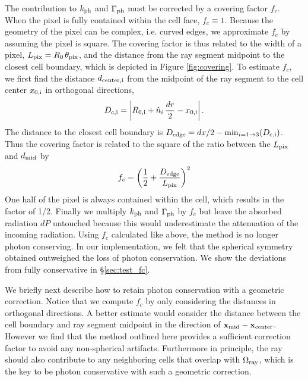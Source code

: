 \documentclass[12pt,preprint]{aastex}
\begin{document}
The contribution to $k_{\rm ph}$ and $\Gamma_{\rm ph}$ must be
corrected by a covering factor $f_c$.  When the pixel is fully
contained within the cell face, $f_c \equiv 1$.  Because the geometry
of the pixel can be complex, i.e. curved edges, we approximate $f_c$
by assuming the pixel is square.  The covering factor is thus related
to the width of a pixel, $L_{\rm pix} = R_0 \, \theta_{\rm pix}$, and
the distance from the ray segment midpoint to the closest cell
boundary, which is depicted in Figure \ref{fig:covering}.  To estimate
$f_c$, we first find the distance $d_{\rm center,i}$ from the midpoint
of the ray segment to the cell center $x_{\rm 0,i}$ in orthogonal
directions,
%
\begin{equation}
  \label{eqn:midpoint}
  D_{\rm c,i} = \left| R_{\rm 0,i} + \hat{n}_i\,\frac{dr}{2} - x_{\rm
      0,i} \right|.
\end{equation}
The distance to the closest cell boundary is $D_{\rm edge} = dx/2 -
\min_{i=1 \rightarrow 3} (D_{\rm c,i})$.  Thus the covering
factor is related to the square of the ratio between the $L_{\rm pix}$
and $d_{\rm mid}$ by
%
\begin{equation}
  \label{eqn:fc}
  f_c = \left( \frac{1}{2} + \frac{D_{\rm edge}}{L_{\rm pix}} \right)^2
\end{equation}
One half of the pixel is always contained within the cell, which
results in the factor of 1/2.  Finally we multiply $k_{\rm ph}$ and
$\Gamma_{\rm ph}$ by $f_c$ but leave the absorbed radiation $dP$
untouched because this would underestimate the attenuation of the
incoming radiation.  Using $f_c$ calculated like above, the method is
no longer photon conserving.  In our implementation, we felt that the
spherical symmetry obtained outweighed the loss of photon
conservation.  We show the deviations from fully conservative in
\S\ref{sec:test_fc}.  

We briefly next describe how to retain photon conservation with a
geometric correction.  Notice that we compute $f_c$ by only
considering the distances in orthogonal directions.  A better estimate
would consider the distance between the cell boundary and ray segment
midpoint in the direction of $\mathbf{x}_{\rm mid} - \mathbf{x}_{\rm
  center}$.  However we find that the method outlined here provides a
sufficient correction factor to avoid any non-spherical artifacts.
Furthermore in principle, the ray should also contribute to any
neighboring cells that overlap with $\Omega_{\rm ray}$, which is the
key to be photon conservative with such a geometric correction.
\end{document}
